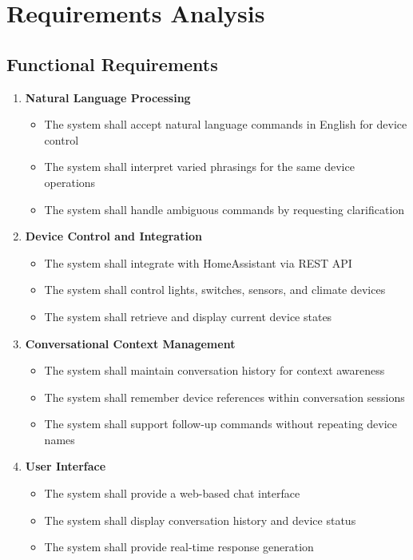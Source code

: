 \documentclass[12pt]{article}
\begin{document}
\section{Requirements Analysis}

\subsection{Functional Requirements}

\begin{enumerate}[label=FR-\arabic*]
\item \textbf{Natural Language Processing}
    \begin{itemize}
    \item The system shall accept natural language commands in English for device control
    \item The system shall interpret varied phrasings for the same device operations
    \item The system shall handle ambiguous commands by requesting clarification
    \end{itemize}

\item \textbf{Device Control and Integration}
    \begin{itemize}
    \item The system shall integrate with HomeAssistant via REST API
    \item The system shall control lights, switches, sensors, and climate devices
    \item The system shall retrieve and display current device states
    \end{itemize}

\item \textbf{Conversational Context Management}
    \begin{itemize}
    \item The system shall maintain conversation history for context awareness
    \item The system shall remember device references within conversation sessions
    \item The system shall support follow-up commands without repeating device names
    \end{itemize}

\item \textbf{User Interface}
    \begin{itemize}
    \item The system shall provide a web-based chat interface
    \item The system shall display conversation history and device status
    \item The system shall provide real-time response generation
    \end{itemize}


\end{enumerate}
\end{document}
